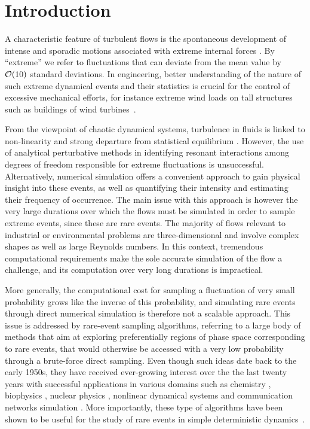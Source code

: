 \section{Introduction}

%
A characteristic feature of turbulent flows is the spontaneous development of intense and sporadic motions associated with extreme internal forces \citep{lesieur_book,donzis_sreenivasan_2010,Yeung}.
By ``extreme'' we refer to fluctuations that can deviate from the mean value by ${\cal{O}}(10)$ standard deviations.
In engineering, better understanding of the nature of such extreme dynamical events and their statistics is crucial for the control of excessive mechanical efforts, for instance extreme wind loads on tall structures such as buildings of wind turbines~\cite{kanev2019}.
%

From the viewpoint of chaotic dynamical systems, turbulence in fluids is linked to non-linearity and strong departure from statistical equilibrium \citep{KRAICHNAN}.
However, the use of analytical perturbative methods in identifying resonant interactions among degrees of freedom responsible for extreme fluctuations is unsuccessful.
Alternatively, numerical simulation offers a convenient approach to gain physical insight into these events, as well as quantifying their intensity and estimating their frequency of occurrence.
The main issue with this approach is however the very large durations over which the flows must be simulated in order to sample extreme events, since these are rare events.
The majority of flows relevant to industrial or environmental problems are three-dimensional and involve complex shapes as well as large Reynolds numbers.
In this context, tremendous computational requirements make the sole accurate simulation of the flow a challenge, and its computation over very long durations is impractical.

%
More generally, the computational cost for sampling a fluctuation of very small probability grows like the inverse of this probability, and simulating rare events through direct numerical simulation is therefore not a scalable approach.
This issue is addressed by rare-event sampling algorithms, referring to a large body of methods that aim at exploring preferentially regions of phase space corresponding to rare events, that would otherwise be accessed with a very low probability through a brute-force direct sampling.
%
Even though such ideas date back to the early 1950s, they have received ever-growing interest over the the last twenty years with successful applications in various domains such as chemistry \citep{van_erp_elaborating_2005,escobedo_transition_2009,teo_adaptive_2016}, biophysics \citep{huber_weighted-ensemble_1996,zuckerman2017weighted,bolhuis2005kinetic}, nuclear physics \citep{louvin2017}, nonlinear dynamical systems \citep{tailleur_probing_2007} and communication networks simulation \citep{villen-altamirano_restart:_1994}.
More importantly, these type of algorithms have been shown to be useful for the study of rare events in simple deterministic dynamics~\citep{wouters2016rare}.

